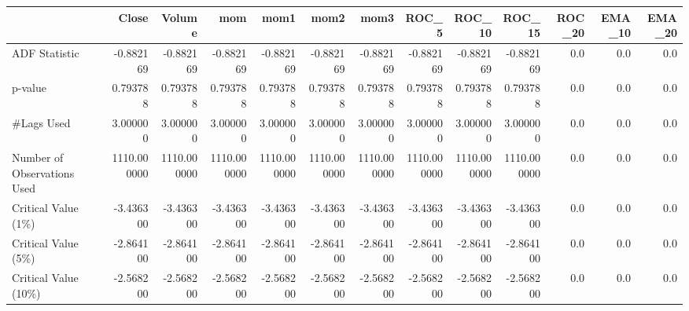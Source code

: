 \begin{tabular}{lrrrrrrrrrrrr}
\toprule
{} &        Close &       Volume &          mom &         mom1 &         mom2 &         mom3 &        ROC\_5 &       ROC\_10 &       ROC\_15 &  ROC\_20 &  EMA\_10 &  EMA\_20 \\
\midrule
ADF Statistic               &    -0.882169 &    -0.882169 &    -0.882169 &    -0.882169 &    -0.882169 &    -0.882169 &    -0.882169 &    -0.882169 &    -0.882169 &     0.0 &     0.0 &     0.0 \\
p-value                     &     0.793788 &     0.793788 &     0.793788 &     0.793788 &     0.793788 &     0.793788 &     0.793788 &     0.793788 &     0.793788 &     0.0 &     0.0 &     0.0 \\
\#Lags Used                  &     3.000000 &     3.000000 &     3.000000 &     3.000000 &     3.000000 &     3.000000 &     3.000000 &     3.000000 &     3.000000 &     0.0 &     0.0 &     0.0 \\
Number of Observations Used &  1110.000000 &  1110.000000 &  1110.000000 &  1110.000000 &  1110.000000 &  1110.000000 &  1110.000000 &  1110.000000 &  1110.000000 &     0.0 &     0.0 &     0.0 \\
Critical Value (1\%)         &    -3.436300 &    -3.436300 &    -3.436300 &    -3.436300 &    -3.436300 &    -3.436300 &    -3.436300 &    -3.436300 &    -3.436300 &     0.0 &     0.0 &     0.0 \\
Critical Value (5\%)         &    -2.864100 &    -2.864100 &    -2.864100 &    -2.864100 &    -2.864100 &    -2.864100 &    -2.864100 &    -2.864100 &    -2.864100 &     0.0 &     0.0 &     0.0 \\
Critical Value (10\%)        &    -2.568200 &    -2.568200 &    -2.568200 &    -2.568200 &    -2.568200 &    -2.568200 &    -2.568200 &    -2.568200 &    -2.568200 &     0.0 &     0.0 &     0.0 \\
\bottomrule
\end{tabular}
